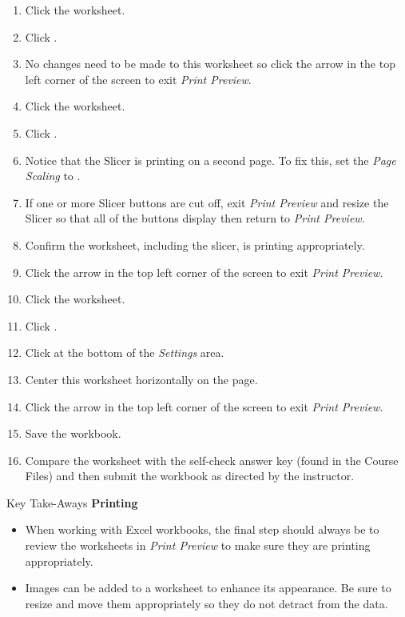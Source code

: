 \begin{enumerate}
	\item Click the  worksheet.
	\item Click .
	\item No changes need to be made to this worksheet so click the arrow in the top left corner of the screen to exit \textit{Print Preview}.

	\item Click the  worksheet.
	\item Click .
	\item Notice that the Slicer is printing on a second page. To fix this, set the \textit{Page Scaling} to .
	\item If one or more Slicer buttons are cut off, exit \textit{Print Preview} and resize the Slicer so that all of the buttons display then return to \textit{Print Preview}.
	\item Confirm the worksheet, including the slicer, is printing appropriately. 
	\item Click the arrow in the top left corner of the screen to exit \textit{Print Preview}.

	\item Click the  worksheet.
	\item Click .
	\item Click  at the bottom of the \textit{Settings} area.
	\item Center this worksheet horizontally on the page. 
	\item Click the arrow in the top left corner of the screen to exit \textit{Print Preview}.

	\item Save the  workbook.
	\item Compare the worksheet with the self-check answer key (found in the Course Files) and then submit the  workbook as directed by the instructor.
\end{enumerate}

\begin{center}
	\begin{tkwbox}{Key Take-Aways}
		\textbf{Printing}
		\\
		\begin{itemize}
			\setlength{\itemsep}{0pt}
			\setlength{\parskip}{0pt}
			\setlength{\parsep}{0pt}

			\item When working with Excel workbooks, the final step should always be to review the worksheets in \textit{Print Preview} to make sure they are printing appropriately.
			\item Images can be added to a worksheet to enhance its appearance. Be sure to resize and move them appropriately so they do not detract from the data.

		\end{itemize}
	\end{tkwbox}
\end{center}

